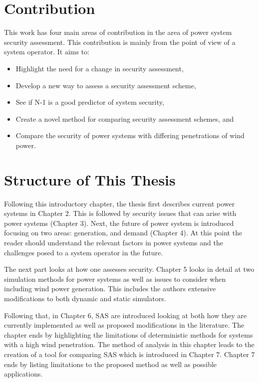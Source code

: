 \documentclass[a4paper,oneside,12pt]{report}
\begin{document}
\section{Contribution}

This work has four main areas of contribution in the area of power system security assessment. This contribution is mainly from the point of view of a system operator. It aims to:

\begin{itemize}
\item Highlight the need for a change in security assessment,
\item Develop a new way to assess a security assessment scheme,
\item See if N-1 is a good predictor of system security,
\item Create a novel method for comparing security assessment schemes, and
\item Compare the security of power systems with differing penetrations of wind power.
\end{itemize}

\section{Structure of This Thesis}

Following this introductory chapter, the thesis first describes current power systems in Chapter 2. This is followed by security issues that can arise with power systems (Chapter 3). Next, the future of power system is introduced focusing on two areas: generation, and demand (Chapter 4). At this point the reader should understand the relevant factors in power systems and the challenges posed to a system operator in the future.

The next part looks at how one assesses security. Chapter 5 looks in detail at two simulation methods for power systems as well as issues to consider when including wind power generation. This includes the authors extensive modifications to both dynamic and static simulators.

Following that, in Chapter 6, SAS are introduced looking at both how they are currently implemented as well as proposed modifications in the literature. The chapter ends by highlighting the limitations of deterministic methods for systems with a high wind penetration. The method of analysis in this chapter leads to the creation of a tool for comparing SAS which is introduced in Chapter 7. Chapter 7 ends by listing limitations to the proposed method as well as possible applications. 
\end{document}
